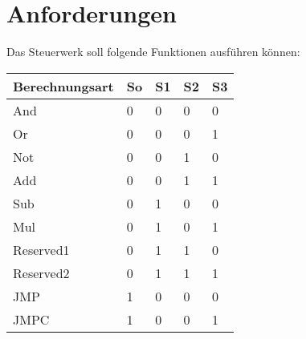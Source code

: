 \chapter{Anforderungen}
\label{chap:anforderungen}

Das Steuerwerk soll folgende Funktionen ausführen können:


\begin{table}[ht]
    \centering
    \begin{tabular}{| l | l | l | l| l |}
        \hline
        \cellcolor[gray]{0.8} \textbf{Berechnungsart} & \cellcolor[gray]{0.8} \textbf{So} & \cellcolor[gray]{0.8} \textbf{S1} &
        \cellcolor[gray]{0.8} \textbf{S2}             & \cellcolor[gray]{0.8} \textbf{S3}                                             \\
        \hline
        And                                           & 0                                 & 0                                 & 0 & 0 \\
        \hline
        Or                                            & 0                                 & 0                                 & 0 & 1 \\
        \hline
        Not                                           & 0                                 & 0                                 & 1 & 0 \\
        \hline
        Add                                           & 0                                 & 0                                 & 1 & 1 \\
        \hline
        Sub                                           & 0                                 & 1                                 & 0 & 0 \\
        \hline
        Mul                                           & 0                                 & 1                                 & 0 & 1 \\
        \hline
        Reserved1                                     & 0                                 & 1                                 & 1 & 0 \\
        \hline
        Reserved2                                     & 0                                 & 1                                 & 1 & 1 \\
        \hline
        JMP                                           & 1                                 & 0                                 & 0 & 0 \\
        \hline
        JMPC                                          & 1                                 & 0                                 & 0 & 1 \\

\end{tabular}
\end{table}
